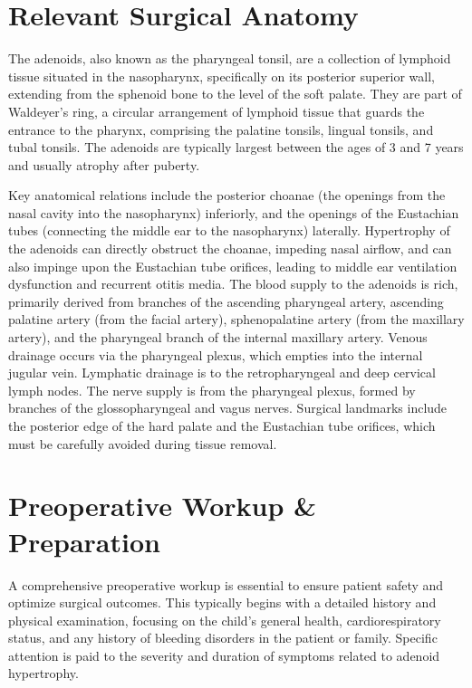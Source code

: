 \section*{Relevant Surgical Anatomy}
The adenoids, also known as the pharyngeal tonsil, are a collection of lymphoid tissue situated in the nasopharynx, specifically on its posterior superior wall, extending from the sphenoid bone to the level of the soft palate. They are part of Waldeyer's ring, a circular arrangement of lymphoid tissue that guards the entrance to the pharynx, comprising the palatine tonsils, lingual tonsils, and tubal tonsils. The adenoids are typically largest between the ages of 3 and 7 years and usually atrophy after puberty.

Key anatomical relations include the posterior choanae (the openings from the nasal cavity into the nasopharynx) inferiorly, and the openings of the Eustachian tubes (connecting the middle ear to the nasopharynx) laterally. Hypertrophy of the adenoids can directly obstruct the choanae, impeding nasal airflow, and can also impinge upon the Eustachian tube orifices, leading to middle ear ventilation dysfunction and recurrent otitis media. The blood supply to the adenoids is rich, primarily derived from branches of the ascending pharyngeal artery, ascending palatine artery (from the facial artery), sphenopalatine artery (from the maxillary artery), and the pharyngeal branch of the internal maxillary artery. Venous drainage occurs via the pharyngeal plexus, which empties into the internal jugular vein. Lymphatic drainage is to the retropharyngeal and deep cervical lymph nodes. The nerve supply is from the pharyngeal plexus, formed by branches of the glossopharyngeal and vagus nerves. Surgical landmarks include the posterior edge of the hard palate and the Eustachian tube orifices, which must be carefully avoided during tissue removal.

\section*{Preoperative Workup \& Preparation}
A comprehensive preoperative workup is essential to ensure patient safety and optimize surgical outcomes. This typically begins with a detailed history and physical examination, focusing on the child's general health, cardiorespiratory status, and any history of bleeding disorders in the patient or family. Specific attention is paid to the severity and duration of symptoms related to adenoid hypertrophy.

